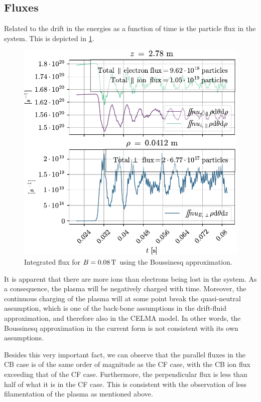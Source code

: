 \subsection{Fluxes}
%
Related to the drift in the energies as a function of time is the particle flux in the system.
This is depicted in \cref{fig:fluxB0008}.
%
\begin{figure}[htb]
    \centering
    \includegraphics{fig/results/compareBouss/flux008B}
    \caption{Integrated flux for $B=0.08\, \text{T}$ using the Boussinesq approximation.}
    \label{fig:fluxB0008}
\end{figure}
%
It is apparent that there are more ions than electrons being lost in the system.
As a consequence, the plasma will be negatively charged with time.
Moreover, the continuous charging of the plasma will at some point break the quasi-neutral assumption, which is one of the back-bone assumptions in the drift-fluid approximation, and therefore also in the CELMA model.
In other words, the Boussinesq approximation in the current form is not consistent with its own assumptions.

Besides this very important fact, we can observe that the parallel fluxes in the CB case is of the same order of magnitude as the CF case, with the CB ion flux exceeding that of the CF case.
Furthermore, the perpendicular flux is less than half of what it is in the CF case.
This is consistent with the observation of less filamentation of the plasma as mentioned above.


